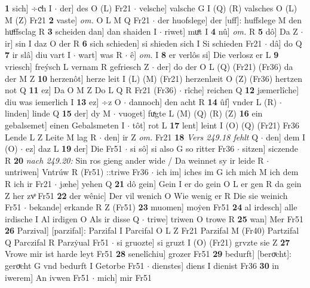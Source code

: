 \documentclass[8pt,a4paper,notitlepage]{article}
\begin{document}
\begin{table}[ht]
\begin{minipage}[t]{0.5\linewidth}
\textbf{1} sich] ÷cͮh I  $\cdot$ der] des O (L) Fr21  $\cdot$ velsche] valsche G I (Q) (R) valsches O (L) M (Z) Fr21 \textbf{2} vaste] \textit{om.} O L M Q Fr21  $\cdot$ der huofslege] der [uff]: huffslege M den huͦffsclag R \textbf{3} scheiden dan] dan shaiden I  $\cdot$ riwet] muͤt I \textbf{4} nû] \textit{om.} R \textbf{5} dô] Da Z  $\cdot$ ir] sin I daz O der R \textbf{6} sich schieden] si shieden sich I Si schieden Fr21  $\cdot$ dâ] do Q \textbf{7} ir slâ] diu vart I  $\cdot$ wart] was R  $\cdot$ ê] \textit{om.} I \textbf{8} er verlôs si] Die verlosz er L \textbf{9} vriesch] freýsch L vernam R gefriesch Z  $\cdot$ der] do der O L (Q) (Fr21) (Fr36) da der M Z \textbf{10} herzenôt] herze leit I (L) (M) (Fr21) herzenlæit O (Z) (Fr36) hertzen not Q \textbf{11} ez] Da O M Z Do L Q R Fr21 (Fr36)  $\cdot$ rîche] reichen Q \textbf{12} jæmerlîche] diu was iemerlich I \textbf{13} ez] ÷z O  $\cdot$ dannoch] den acht R \textbf{14} ûf] vnder L (R)  $\cdot$ linden] linde Q \textbf{15} der] dy M  $\cdot$ vuoget] fuͯgte L (M) (Q) (R) (Z) \textbf{16} ein gebalsemet] einen Gebalsmeten I  $\cdot$ tôt] rot L \textbf{17} lent] leint I (O) (Q) (Fr21) Fr36 Lende L Z Leite M lag R  $\cdot$ den] ir Z \textit{om.} Fr21 \textbf{18} \textit{Vers 249.18 fehlt} Q   $\cdot$ den] dem I (O)  $\cdot$ ez] daz L \textbf{19} der] Die Fr51  $\cdot$ si sô] si also G so ritter Fr36  $\cdot$ sitzen] siczende R \textbf{20} \textit{nach 249.20:} Sin ros gieng ander wide / Da weinnet sy ir leide R   $\cdot$ untriwen] Vntrúw R (Fr51) ::triwe Fr36  $\cdot$ ich im] iches im G ich mich M ich dem R ich ir Fr21  $\cdot$ jæhe] yehen Q \textbf{21} dô gein] Gein I er do gein O L er gen R da gein Z her zvͦ Fr51 \textbf{22} der wênic] Der vil wenich O Wie wenig er R Die sie weinich Fr51  $\cdot$ bekande] erkande R Z (Fr51) \textbf{23} muomen] moẏen Fr51 \textbf{24} al irdesch] alle irdische I Al irdigen O Als ir disse Q  $\cdot$ triwe] triwen O trowe R \textbf{25} wan] Mer Fr51 \textbf{26} Parzival] [parzifal]: Parzifal I Parcifal O L Z Fr21 Parzifal M (Fr40) Partzifal Q Parczifal R Parzẏual Fr51  $\cdot$ si gruozte] si gruzt I (O) (Fr21) grvzte sie Z \textbf{27} Vrowe mir ist harde leyt Fr51 \textbf{28} senelîchiu] grozer Fr51 \textbf{29} bedurft] [beroͮcht]: geroͮcht G vnd bedurft I Getorbe Fr51  $\cdot$ dienstes] diens I dienist Fr36 \textbf{30} in iwerem] An ivwen Fr51  $\cdot$ mich] mir Fr51 \newline
\end{minipage}
\hspace{0.5cm}
\begin{minipage}[t]{0.5\linewidth}

\end{minipage}
\end{table}
\end{document}
